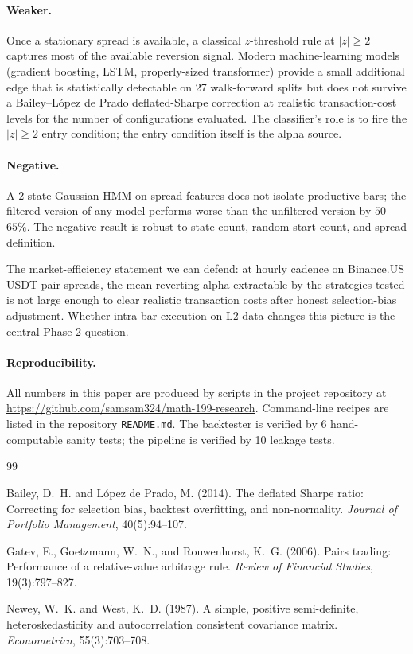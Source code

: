 \documentclass[11pt]{article}
\begin{document}
\paragraph{Weaker.} Once a stationary spread is available, a
classical $z$-threshold rule at $|z| \geq 2$ captures most of the
available reversion signal. Modern machine-learning models (gradient
boosting, LSTM, properly-sized transformer) provide a small
additional edge that is statistically detectable on 27 walk-forward
splits but does not survive a Bailey--L\'opez de Prado deflated-Sharpe
correction at realistic transaction-cost levels for the number of
configurations evaluated. The classifier's role is to fire the
$|z| \geq 2$ entry condition; the entry condition itself is the
alpha source.

\paragraph{Negative.} A 2-state Gaussian HMM on spread features does
not isolate productive bars; the filtered version of any model
performs worse than the unfiltered version by $50$--$65\%$. The
negative result is robust to state count, random-start count, and
spread definition.

The market-efficiency statement we can defend: at hourly cadence on
Binance.US USDT pair spreads, the mean-reverting alpha extractable by
the strategies tested is not large enough to clear realistic
transaction costs after honest selection-bias adjustment. Whether
intra-bar execution on L2 data changes this picture is the central
Phase 2 question.

\paragraph{Reproducibility.} All numbers in this paper are produced
by scripts in the project repository at
\url{https://github.com/samsam324/math-199-research}. Command-line
recipes are listed in the repository \texttt{README.md}. The
backtester is verified by 6 hand-computable sanity tests; the
pipeline is verified by 10 leakage tests.


\begin{thebibliography}{99}

Bailey, D.~H. and L\'opez de Prado, M. (2014).
\newblock The deflated Sharpe ratio: Correcting for selection bias,
backtest overfitting, and non-normality.
\newblock \emph{Journal of Portfolio Management}, 40(5):94--107.

Gatev, E., Goetzmann, W.~N., and Rouwenhorst, K.~G. (2006).
\newblock Pairs trading: Performance of a relative-value arbitrage rule.
\newblock \emph{Review of Financial Studies}, 19(3):797--827.

Newey, W.~K. and West, K.~D. (1987).
\newblock A simple, positive semi-definite, heteroskedasticity and
autocorrelation consistent covariance matrix.
\newblock \emph{Econometrica}, 55(3):703--708.

\end{thebibliography}
\end{document}

